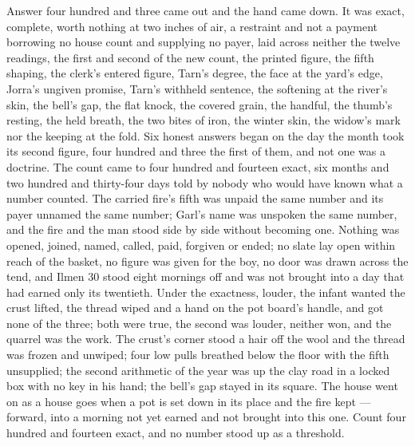 Answer four hundred and three came out and the hand came down. It was exact, complete, worth nothing at two inches of air, a restraint and not a payment borrowing no house count and supplying no payer, laid across neither the twelve readings, the first and second of the new count, the printed figure, the fifth shaping, the clerk's entered figure, Tarn's degree, the face at the yard's edge, Jorra's ungiven promise, Tarn's withheld sentence, the softening at the river's skin, the bell's gap, the flat knock, the covered grain, the handful, the thumb's resting, the held breath, the two bites of iron, the winter skin, the widow's mark nor the keeping at the fold. Six honest answers began on the day the month took its second figure, four hundred and three the first of them, and not one was a doctrine. The count came to four hundred and fourteen exact, six months and two hundred and thirty-four days told by nobody who would have known what a number counted. The carried fire's fifth was unpaid the same number and its payer unnamed the same number; Garl's name was unspoken the same number, and the fire and the man stood side by side without becoming one. Nothing was opened, joined, named, called, paid, forgiven or ended; no slate lay open within reach of the basket, no figure was given for the boy, no door was drawn across the tend, and Ilmen 30 stood eight mornings off and was not brought into a day that had earned only its twentieth. Under the exactness, louder, the infant wanted the crust lifted, the thread wiped and a hand on the pot board's handle, and got none of the three; both were true, the second was louder, neither won, and the quarrel was the work. The crust's corner stood a hair off the wool and the thread was frozen and unwiped; four low pulls breathed below the floor with the fifth unsupplied; the second arithmetic of the year was up the clay road in a locked box with no key in his hand; the bell's gap stayed in its square. The house went on as a house goes when a pot is set down in its place and the fire kept --- forward, into a morning not yet earned and not brought into this one. Count four hundred and fourteen exact, and no number stood up as a threshold.
